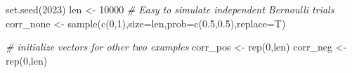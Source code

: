 \documentclass[
  11pt,
]{book}
\newenvironment{Shaded}{\begin{snugshade}}{\end{snugshade}}
\newcommand{\AttributeTok}[1]{\textcolor[rgb]{0.77,0.63,0.00}{#1}}
\newcommand{\CommentTok}[1]{\textcolor[rgb]{0.56,0.35,0.01}{\textit{#1}}}
\newcommand{\DecValTok}[1]{\textcolor[rgb]{0.00,0.00,0.81}{#1}}
\newcommand{\FloatTok}[1]{\textcolor[rgb]{0.00,0.00,0.81}{#1}}
\newcommand{\FunctionTok}[1]{\textcolor[rgb]{0.00,0.00,0.00}{#1}}
\newcommand{\NormalTok}[1]{#1}
\newcommand{\OtherTok}[1]{\textcolor[rgb]{0.56,0.35,0.01}{#1}}
\theoremstyle{definition}
\theoremstyle{definition}
\theoremstyle{definition}
\theoremstyle{definition}
\theoremstyle{remark}
\begin{document}
\begin{Shaded}
\begin{Highlighting}[]
\FunctionTok{set.seed}\NormalTok{(}\DecValTok{2023}\NormalTok{)}
\NormalTok{len }\OtherTok{\textless{}{-}} \DecValTok{10000}
\CommentTok{\# Easy to simulate independent Bernoulli trials}
\NormalTok{corr\_none }\OtherTok{\textless{}{-}} \FunctionTok{sample}\NormalTok{(}\FunctionTok{c}\NormalTok{(}\DecValTok{0}\NormalTok{,}\DecValTok{1}\NormalTok{),}\AttributeTok{size=}\NormalTok{len,}\AttributeTok{prob=}\FunctionTok{c}\NormalTok{(}\FloatTok{0.5}\NormalTok{,}\FloatTok{0.5}\NormalTok{),}\AttributeTok{replace=}\NormalTok{T)}

\CommentTok{\# initialize vectors for other two examples}
\NormalTok{corr\_pos }\OtherTok{\textless{}{-}} \FunctionTok{rep}\NormalTok{(}\DecValTok{0}\NormalTok{,len)}
\NormalTok{corr\_neg }\OtherTok{\textless{}{-}} \FunctionTok{rep}\NormalTok{(}\DecValTok{0}\NormalTok{,len)}


\end{Highlighting}
\end{Shaded}
\end{document}
